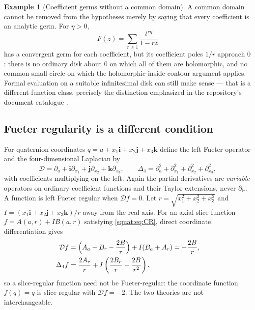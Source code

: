 \documentclass[11pt,letterpaper]{article}
\numberwithin{equation}{section}
\theoremstyle{definition}
\newtheorem{example}[example]{Example}
\theoremstyle{remark}
\newcommand{\ii}{\mathbf i}
\newcommand{\jj}{\mathbf j}
\newcommand{\kk}{\mathbf k}
\newcommand{\DD}{\mathcal D}
\newcommand{\dH}{\partial_{\mathbb H}}
\begin{document}
\begin{example}[Coefficient germs without a common domain]\label{squat:ex:nocommondomain}
A common domain cannot be removed from the hypotheses merely by saying that every
coefficient is an analytic germ. For $\eta>0$,
\begin{equation}\label{squat:eq:nocommondomain}
 F(z)=\sum_{r\ge1}\frac{t^{r\eta}}{1-rz}
\end{equation}
has a convergent germ for each coefficient, but its coefficient poles $1/r$ approach $0$:
there is no ordinary disk about $0$ on which all of them are holomorphic, and no common
small circle on which the holomorphic-inside-contour argument applies. Formal evaluation on
a suitable infinitesimal disk can still make sense --- that is a different function class,
precisely the distinction emphasized in the repository's document catalogue
\cite{RepoDocs}.
\end{example}

\subsection{Fueter regularity is a different condition}\label{squat:sec:fueter}
For quaternion coordinates $q=a+x_1\ii+x_2\jj+x_3\kk$ define the left Fueter operator and
the four-dimensional Laplacian by
\[
 \DD=\partial_a+\ii\partial_{x_1}+\jj\partial_{x_2}+\kk\partial_{x_3},
 \qquad
 \Delta_4=\partial_a^2+\partial_{x_1}^2+\partial_{x_2}^2+\partial_{x_3}^2,
\]
with coefficients multiplying on the left. Again the partial derivatives are
\emph{variable} operators on ordinary coefficient functions and their Taylor extensions,
never $\dH$. A function is left Fueter regular when $\DD f=0$. Let
$r=\sqrt{x_1^2+x_2^2+x_3^2}$ and $I=(x_1\ii+x_2\jj+x_3\kk)/r$ away from the real axis. For
an axial slice function $f=A(a,r)+IB(a,r)$ satisfying \cref{squat:eq:CR}, direct coordinate
differentiation gives
\begin{align}
 \DD f&=\Bigl(A_a-B_r-\frac{2B}{r}\Bigr)+I(B_a+A_r)=-\frac{2B}{r},
 \label{squat:eq:fueterslice}\\
 \Delta_4f&=\frac{2A_r}{r}+I\left(\frac{2B_r}{r}-\frac{2B}{r^2}\right),
 \label{squat:eq:fuetertransform}
\end{align}
so a slice-regular function need not be Fueter-regular: the coordinate function $f(q)=q$
is slice regular with $\DD f=-2$. The two theories are not interchangeable.
\end{document}
